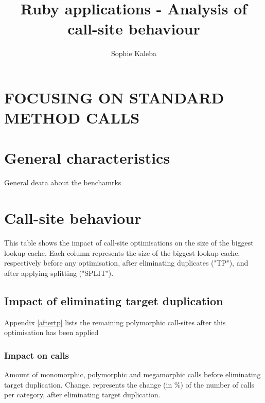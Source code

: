 \documentclass[10pt, sigplan, preprint]{acmart}
\begin{document}
\title{Ruby applications - Analysis of call-site behaviour}

\author{Sophie Kaleba}

\maketitle


\section{FOCUSING ON STANDARD METHOD CALLS}

\section{General characteristics}

\begin{table}[!h]
	\caption{General deata about the benchamrks}
	\centering
	\tiny
	\Metrics
	\label{tab:metrics}
	\end{table}

\section{Call-site behaviour}

This table shows the impact of call-site optimisations on the size of the biggest lookup cache.
Each column represents the size of the biggest lookup cache, respectively before any optimisation, after eliminating duplicates ("TP"), and after applying splitting ("SPLIT").

\subsection{Impact of eliminating target duplication}

Appendix \ref{aftertp} lists the remaining polymorphic call-sites after this optimisation has been applied

\subsubsection{\textbf{Impact on calls}}

Amount of monomorphic, polymorphic and megamorphic calls before eliminating target duplication.
Change. represents the change (in \%) of the number of calls per category, after eliminating target duplication.
\end{document}
